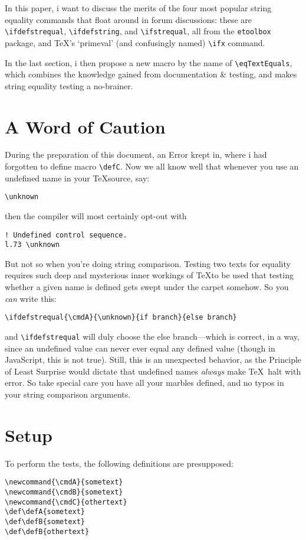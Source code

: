 \documentclass[a5paper,10pt,german]{article}
\newcommand{\cmdA}{sometext}
\newcommand{\cmdB}{sometext}
\newcommand{\cmdC}{othertext}
\def\defA{sometext}
\def\defB{sometext}
\def\defC{othertext}
\begin{document}
In this paper, i want to discuss the merits of the four most popular string equality
commands that float around in forum discussions: these are \verb#\ifdefstrequal#,
\verb#\ifdefstring#, and \verb#\ifstrequal#, all from the \verb#etoolbox# package, and \TeX's `primeval'
(and confusingly named) \verb#\ifx# command.

In the last section, i then propose a new macro by the name of \verb#\eqTextEquals#, which combines the
knowledge gained from documentation \& testing, and makes string equality testing a no-brainer.

\newpage
\section{A Word of Caution}

During the preparation of this document, an Error krept in, where i had forgotten to define macro
\verb#\defC#. Now we all know well that whenever you use an undefined name in your \TeX source, say:

\verb#\unknown#

then the compiler will most certainly opt-out with

\verb#! Undefined control sequence.#\\
\verb#l.73 \unknown#

But not so when you're doing string comparison. Testing two texts for equality requires such deep and
mysterious inner workings of \TeX to be used that testing whether a given name is defined gets swept under
the carpet somehow. So you {\em can} write this:

\verb#\ifdefstrequal{\cmdA}{\unknown}{if branch}{else branch}#

and \verb#\ifdefstrequal# will duly choose the else branch—which is correct, in a way, since an undefined
value can never ever equal any defined value (though in JavaScript, this is not true). Still, this is an
unexpected behavior, as the Principle of Least Surprise would dictate that undefined names {\em always}
make \TeX\ halt with error. So take special care you have all your marbles defined, and no typos in your
string comparison arguments.


\newpage
\section{Setup}

To perform the tests, the following definitions are presupposed:

\verb#\newcommand{\cmdA}{sometext}#\\
\verb#\newcommand{\cmdB}{sometext}#\\
\verb#\newcommand{\cmdC}{othertext}#\\
\verb#\def\defA{sometext}#\\
\verb#\def\defB{sometext}#\\
\verb#\def\defB{othertext}#
\end{document}
